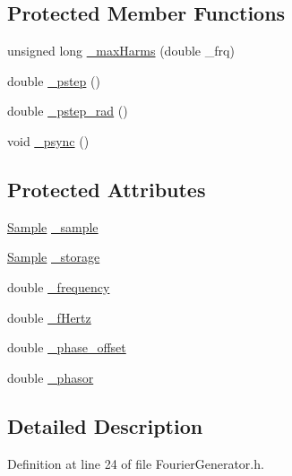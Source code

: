 \subsection*{Protected Member Functions}
\begin{DoxyCompactItemize}
\item 
unsigned long \hyperlink{classSignal_1_1Fourier_1_1FourierGenerator_a99720416bd9ff96636f4acf956a785d5}{\+\_\+max\+Harms} (double \+\_\+frq)
\item 
double \hyperlink{classSignal_1_1SignalGenerator_a43b0eec84ee7df04c947533c0511c2c0}{\+\_\+pstep} ()
\item 
double \hyperlink{classSignal_1_1SignalGenerator_abf2f4ab977c6e84bf85022eab8135304}{\+\_\+pstep\+\_\+rad} ()
\item 
void \hyperlink{classSignal_1_1SignalGenerator_a563f57d4dfd8728a6a572f15c1e2532b}{\+\_\+psync} ()
\end{DoxyCompactItemize}
\subsection*{Protected Attributes}
\begin{DoxyCompactItemize}
\item 
\hyperlink{classSignal_1_1Sample}{Sample} \hyperlink{classSignal_1_1Fourier_1_1FourierGenerator_ad720bf2b268dc621ace64c54c0816597}{\+\_\+sample}
\item 
\hyperlink{classSignal_1_1Sample}{Sample} \hyperlink{classSignal_1_1Fourier_1_1FourierGenerator_ab6e6b79cf56e31c9a1b5766f357f8cfb}{\+\_\+storage}
\item 
double \hyperlink{classSignal_1_1SignalGenerator_a7f107461333bce68c5dad412db96a8c2}{\+\_\+frequency}
\item 
double \hyperlink{classSignal_1_1SignalGenerator_a85a4702347352bab1c71e0a8df8437d6}{\+\_\+f\+Hertz}
\item 
double \hyperlink{classSignal_1_1SignalGenerator_a6b4444d46747c8517171edbbf4b5588f}{\+\_\+phase\+\_\+offset}
\item 
double \hyperlink{classSignal_1_1SignalGenerator_af4aa0728ded00777be26a06d883eaeb3}{\+\_\+phasor}
\end{DoxyCompactItemize}


\subsection{Detailed Description}


Definition at line 24 of file Fourier\+Generator.\+h.




